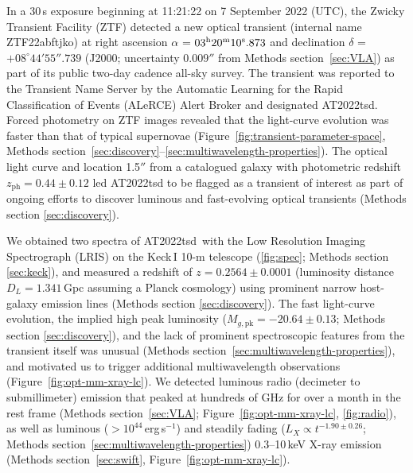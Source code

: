 \documentclass{nature_plusfigure}
\newcommand{\at}{AT2022tsd}
\begin{document}
In a 30\,s exposure beginning at 11:21:22 on 7 September 2022 (UTC), the Zwicky Transient Facility (ZTF\cite{Graham2019,Bellm2019}) detected a new optical transient (internal name ZTF22abftjko) at right ascension $\alpha$ = $03^{\rm{h}}20^{\rm{m}}10^{\rm{s}}.873$ and declination $\delta$ = $+08^{\circ} 44' 55''.739$ 
(J2000; uncertainty $0.009''$ from Methods section~\ref{sec:VLA}) as part of its public two-day cadence all-sky survey.
The transient was reported\cite{Munoz-Arancibia2022} to the Transient Name Server by the Automatic Learning for the Rapid Classification of Events (ALeRCE) Alert Broker\cite{Forster2021} and designated AT2022tsd.
Forced photometry on ZTF images\cite{Masci2019} revealed that the light-curve evolution was faster than that of typical supernovae (Figure~\ref{fig:transient-parameter-space}, Methods section~\ref{sec:discovery}--\ref{sec:multiwavelength-properties}).
The optical light curve and location 1.5$''$ from a catalogued\cite{Beck2021} galaxy with photometric redshift $z_\mathrm{ph}=0.44\pm0.12$ led AT2022tsd to be flagged as a transient of interest as part of ongoing efforts to discover luminous and fast-evolving optical transients (Methods section \ref{sec:discovery}).

We obtained two spectra of \at\ with the Low Resolution Imaging Spectrograph (LRIS\cite{Oke1995}) on the Keck\,I 10-m telescope (\ref{fig:spec}; Methods section \ref{sec:keck}), and measured\cite{Ho2022_Astronote_Keck} a redshift of $z=0.2564\pm0.0001$ (luminosity distance $D_L=1.341\,$Gpc assuming a Planck cosmology\cite{Planck2020}) using prominent narrow host-galaxy emission lines (Methods section \ref{sec:discovery}). 
The fast light-curve evolution, the implied high peak luminosity ($M_{g,\mathrm{pk}}=-20.64\pm0.13$; Methods section \ref{sec:discovery}), and the lack of prominent spectroscopic features from the transient itself was unusual (Methods section~\ref{sec:multiwavelength-properties}), and motivated us to trigger additional multiwavelength observations (Figure~\ref{fig:opt-mm-xray-lc}).
We detected luminous radio (decimeter\cite{Ho2022Astronote_radio} to submillimeter) emission that peaked at hundreds of GHz for over a month in the rest frame (Methods section~\ref{sec:VLA}; Figure~\ref{fig:opt-mm-xray-lc}, \ref{fig:radio}),
as well as luminous ($>10^{44}\,$erg\,s$^{-1}$) and steadily fading ($L_X\propto t^{-1.90\pm0.26}$; Methods section~\ref{sec:multiwavelength-properties}) 0.3--10\,keV X-ray emission\cite{Schulze2022Astronote_xray} (Methods section~\ref{sec:swift}, Figure~\ref{fig:opt-mm-xray-lc}).
\end{document}
